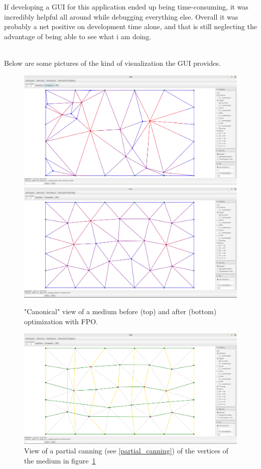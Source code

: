 \documentclass{article}
\begin{document}
If developing a GUI for this application ended up being time-consuming, it was incredibly helpful all around while debugging everything else. Overall it was probably a net positive on development time alone, and that is still neglecting the advantage of being able to see what i am doing.\\
$ $

Below are some pictures of the kind of visualization the GUI provides.

\begin{figure}[H]
	\centering\includegraphics[width=0.8\linewidth]{assets/canonical_before.png}
	\centering\includegraphics[width=0.8\linewidth]{assets/canonical_after.png}
	\caption{"Canonical" view of a medium before (top) and after (bottom) optimization with FPO.}
	\label{fig:gui_before_after_FPO}
\end{figure}

\begin{figure}[H]
	\centering\includegraphics[width=0.8\linewidth]{assets/canning_view.png}
	\caption{View of a partial canning (see \ref{partial_canning}) of the vertices of the medium in figure~\ref{fig:gui_before_after_FPO}}
	\label{fig:gui_canning}
\end{figure}
\end{document}
